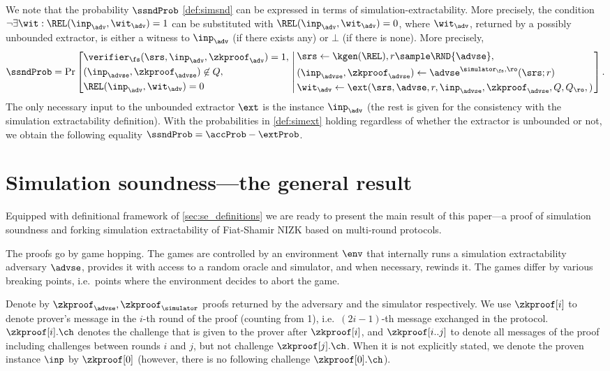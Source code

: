 \label{rem:simext_to_simsnd}
We note that the probability $\ssndProb$ \cref{def:simsnd} can be expressed in
terms of simulation-extractability. More precisely, the
condition $\neg \exists \wit: \REL(\inp_\adv, \wit_\adv) = 1$ can be substituted with
$\REL(\inp_\adv, \wit_\adv) = 0$, where $\wit_\adv$, returned by a possibly unbounded
extractor, is either a witness to $\inp_\adv$ (if there exists any) or $\bot$ (if
there is none). More precisely,
\[
\ssndProb =
\Pr\left[
\begin{aligned}
& \verifier_\fs(\srs, \inp_{\adv}, \zkproof_{\adv}) = 1,\\
& (\inp_{\advse}, \zkproof_{\advse}) \not\in Q,\\
& \REL(\inp_{\adv}, \wit_{\adv}) = 0
\end{aligned}
\, \left| \,
\begin{aligned}
& \srs \gets \kgen(\REL), r \sample \RND{\advse},\\
& (\inp_{\advse}, \zkproof_{\advse}) \gets \advse^{\simulator_\fs,
	\ro} (\srs; r)\\
& \wit_{\adv} \gets \ext(\srs, \advse, r, \inp_{\advse}, \zkproof_{\advse},
Q, Q_\ro,) 
\end{aligned}
\right.  \right].
\]
The only necessary input to the unbounded extractor $\ext$ is the instance
$\inp_\adv$ (the rest is given for the consistency with the simulation extractability
definition). 
%
With the probabilities in \cref{def:simext} holding regardless of whether the extractor
is unbounded or not, we obtain the following equality
$ \ssndProb = \accProb - \extProb$.


\section{Simulation soundness---the general result}
\label{sec:general}
Equipped with definitional framework of \cref{sec:se_definitions} we are ready
to present the main result of this paper---a proof of simulation soundness and
forking simulation extractability of Fiat-Shamir NIZK based on multi-round protocols.

The proofs go by game hopping. The games are controlled by an environment $\env$
that internally runs a simulation extractability adversary $\advse$, provides it
with access to a random oracle and simulator, and when necessary, rewinds it. The
games differ by various breaking points, i.e.~points where the environment
decides to abort the game.

Denote by $\zkproof_{\advse}, \zkproof_{\simulator}$ proofs returned by the
adversary and the simulator respectively. We use $\zkproof[i]$ to denote
prover's message in the $i$-th round of the proof (counting from 1),
i.e.~$(2i - 1)$-th message exchanged in the protocol. $\zkproof[i].\ch$ denotes
the challenge that is given to the prover after $\zkproof[i]$, and
$\zkproof[i..j]$ to denote all messages of the proof including challenges
between rounds $i$ and $j$, but not challenge $\zkproof[j].\ch$. When it is not
explicitly stated, we denote the proven instance $\inp$ by $\zkproof[0]$
(however, there is no following challenge $\zkproof[0].\ch$).

